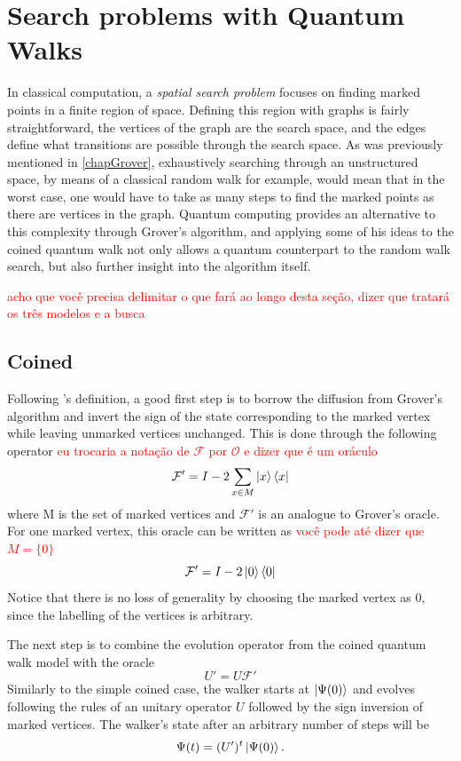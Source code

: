 \documentclass[../../dissertation.tex]{subfiles}
\begin{document}
\section{Search problems with Quantum Walks}
In classical computation, a \textit{spatial search problem} focuses on finding marked points in a finite region of space. Defining this region with graphs is fairly straightforward, the vertices of the graph are the search space, and the edges define what transitions are possible through the search space. As was previously mentioned in \ref{chapGrover}, exhaustively searching through an unstructured space, by means of a classical random walk for example, would mean that in the worst case, one would have to take as many steps to find the marked points as there are vertices in the graph. Quantum computing provides an alternative to this complexity through Grover's algorithm, and applying some of his ideas to the coined quantum walk not only allows a quantum counterpart to the random walk search, but also further insight into the algorithm itself.\par
\textcolor{red}{acho que você precisa delimitar o que fará ao longo desta seção, dizer que tratará os três modelos e a busca}
\subsection{Coined}
Following \cite{REN1}'s definition, a good first step is to borrow the diffusion from Grover's algorithm and invert the sign of the state corresponding to the marked vertex while leaving unmarked vertices unchanged. This is done through the following operator \textcolor{red}{eu trocaria a notação de $\mathcal{F}$ por $\mathcal{O}$ e dizer que é um oráculo}
\begin{equation}
	\mathcal{F'} = I - 2 \sum_{x\in M} \ket{x}\bra{x}
\end{equation}
where M is the set of marked vertices and $\mathcal{F'}$ is an analogue to Grover's oracle. For one marked vertex, this oracle can be written as \textcolor{red}{você pode até dizer que $M=\{0\}$}
\begin{equation}
	\mathcal{F'} = I - 2 \ket{0}\bra{0}
\end{equation}
Notice that there is no loss of generality by choosing the marked vertex as $0$, since the labelling of the vertices is arbitrary.\par
The next step is to combine the evolution operator from the coined quantum walk model with the oracle
\begin{equation}
	U'= U\mathcal{F'}
	\label{eq:43}
\end{equation}
Similarly to the simple coined case, the walker starts at $\ket{\Psi(0)}$ and evolves following the rules of an unitary operator $U$ followed by the sign inversion of marked vertices. The walker's state after an arbitrary number of steps will be
\begin{equation}
	\Psi(t) = (U')^t\ket{\Psi(0)}.
	\label{eq:sysStateSearch}
\end{equation}\par
\end{document}
